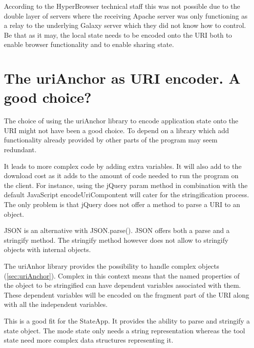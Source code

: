 \documentclass[english]{ifimaster}
\begin{document}
According to the HyperBrowser technical staff this was not possible due to the double layer of servers where the receiving Apache server was only functioning as a relay to the underlying Galaxy server which they did not know how to control. Be that as it may, the local state needs to be encoded onto the URI both to enable browser functionality and to enable sharing state.

\section{The uriAnchor as URI encoder. A good choice?}
The choice of using the uriAnchor library to encode application state onto the URI might not have been a good choice. To depend on a library which add functionality already provided by other parts of the program may seem redundant. 

It leads to more complex code by adding extra variables. It will also add to the download cost as it adds to the amount of code needed to run the program on the client. For instance, using the jQuery param method in combination with the default JavaScript encodeUriCompontent will cater for the stringification process. The only problem is that jQuery does not offer a method to parse a URI to an object. 

JSON is an alternative with JSON.parse(). JSON offers both a parse and a stringify method. The stringify method however does not allow to stringify objects with internal objects.





The uriAnhor library provides the possibility to handle complex objects (\ref{sec:uriAnchor}). Complex in this context means that the named properties of the object to be stringified can have dependent variables associated with them. These dependent variables will be encoded on the fragment part of the URI along with all the independent variables. 

This is a good fit for the StateApp. It provides the ability to parse and stringify a state object. The mode state only needs a string representation whereas the tool state need more complex data structures representing it. 
\end{document}
